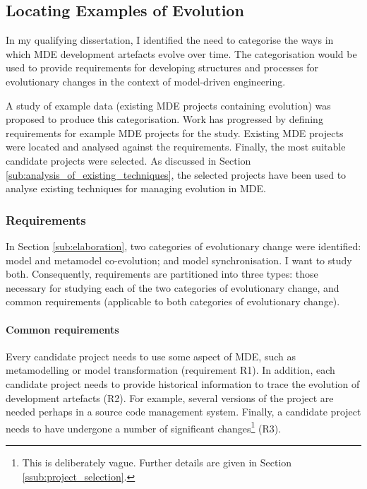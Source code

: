 \subsection{Locating Examples of Evolution}
\label{sub:examples}
In my qualifying dissertation, I identified the need to categorise the ways in which MDE development artefacts evolve over time. The categorisation would be used to provide requirements for developing structures and processes for evolutionary changes in the context of model-driven engineering.

A study of example data (existing MDE projects containing evolution) was proposed to produce this categorisation. Work has progressed by defining requirements for example MDE projects for the study. Existing MDE projects were located and analysed against the requirements. Finally, the most suitable candidate projects were selected. As discussed in Section \ref{sub:analysis_of_existing_techniques}, the selected projects have been used to analyse existing techniques for managing evolution in MDE.

\subsubsection{Requirements} %
\label{ssub:requirements}
In Section \ref{sub:elaboration}, two categories of evolutionary change were identified: model and metamodel co-evolution; and model synchronisation. I want to study both. Consequently, requirements are partitioned into three types: those necessary for studying each of the two categories of evolutionary change, and common requirements (applicable to both categories of evolutionary change).

\paragraph{Common requirements}
Every candidate project needs to use some aspect of MDE, such as metamodelling or model transformation (requirement R1). In addition, each candidate project needs to provide historical information to trace the evolution of development artefacts (R2). For example, several versions of the project are needed perhaps in a source code management system. Finally, a candidate project needs to have undergone a number of significant changes\footnote{This is deliberately vague. Further details are given in Section \ref{ssub:project_selection}.} (R3).


